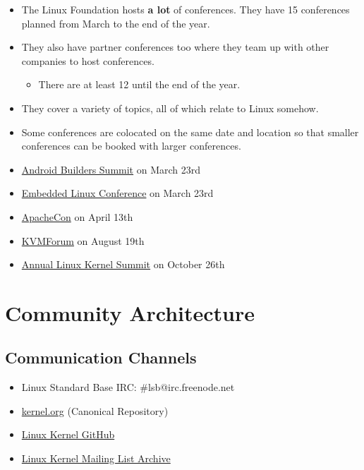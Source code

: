 \begin{itemize}
\itemsep1pt\parskip0pt
\item
  The Linux Foundation hosts \textbf{a lot} of conferences. They have 15
  conferences planned from March to the end of the year.
\item
  They also have partner conferences too where they team up with other
  companies to host conferences.

  \begin{itemize}
  \itemsep1pt\parskip0pt
  \item
    There are at least 12 until the end of the year.
  \end{itemize}
\item
  They cover a variety of topics, all of which relate to Linux somehow.
\item
  Some conferences are colocated on the same date and location so that
  smaller conferences can be booked with larger conferences.
\item
  \href{http://events.linuxfoundation.org/events/android-builders-summit}{Android
  Builders Summit} on March 23rd
\item
  \href{http://events.linuxfoundation.org/events/embedded-linux-conference}{Embedded
  Linux Conference} on March 23rd
\item
  \href{http://events.linuxfoundation.org/events/apachecon-north-america}{ApacheCon}
  on April 13th
\item
  \href{http://events.linuxfoundation.org/events/kvm-forum}{KVMForum} on
  August 19th
\item
  \href{http://events.linuxfoundation.org/events/linux-kernel-summit}{Annual
  Linux Kernel Summit} on October 26th
\end{itemize}

\section{Community Architecture}\label{community-architecture}

\subsection{Communication Channels}\label{communication-channels}

\begin{itemize}
\itemsep1pt\parskip0pt
\item
  Linux Standard Base IRC: \#lsb@irc.freenode.net
\item
  \href{http://kernel.org}{kernel.org} (Canonical Repository)
\item
  \href{https://github.com/torvalds/linux}{Linux Kernel GitHub}
\item
  \href{https://lkml.org/}{Linux Kernel Mailing List Archive}
\end{itemize}

